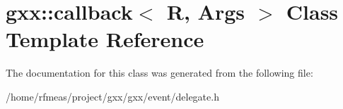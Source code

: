 \hypertarget{classgxx_1_1callback}{}\section{gxx\+:\+:callback$<$ R, Args $>$ Class Template Reference}
\label{classgxx_1_1callback}


The documentation for this class was generated from the following file\+:\begin{DoxyCompactItemize}
\item 
/home/rfmeas/project/gxx/gxx/event/delegate.\+h\end{DoxyCompactItemize}
